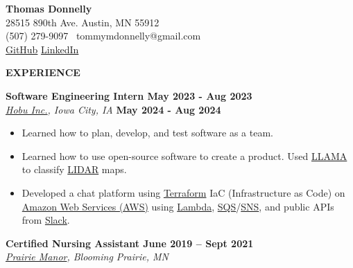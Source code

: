 \textbf{Thomas Donnelly}\\
28515 890th Ave. \textbar{} Austin, MN 55912\\
(507) 279-9097 \textbar~tommymdonnelly@gmail.com\\
\href{https://github.com/TomTheTonk}{GitHub}
\href{http://linkedin.com/in/thomas-donnelly-429405320}{LinkedIn}

\textbf{EXPERIENCE}

\textbf{Software Engineering Intern May 2023 - Aug 2023}\\
\emph{\href{https://www.linkedin.com/company/hobu-inc}{Hobu Inc.}, Iowa
City, IA} \textbf{May 2024 - Aug 2024}

\begin{itemize}
\item
  Learned how to plan, develop, and test software as a team.
\item
  Learned how to use open-source software to create a product. Used
  \href{https://www.llama.com/}{LLAMA} to classify
  \href{https://www.neonscience.org/resources/learning-hub/tutorials/lidar-basics}{LIDAR}
  maps.
\item
  Developed a chat platform using
  \href{https://developer.hashicorp.com/terraform/language}{Terraform}
  IaC (Infrastructure as Code) on
  \href{https://aws.amazon.com/free/?gclid=CjwKCAiAiOa9BhBqEiwABCdG8xJm7dpo0Ifa4i8UYcSexU289wg1I5QgB0YQaTpD3Cc5l3oCR2H94hoCvTYQAvD_BwE\&trk=6a4c3e9d-cdc9-4e25-8dd9-2bd8d15afbca\&sc_channel=ps\&ef_id=CjwKCAiAiOa9BhBqEiwABCdG8xJm7dpo0Ifa4i8UYcSexU289wg1I5QgB0YQaTpD3Cc5l3oCR2H94hoCvTYQAvD_BwE:G:s\&s_kwcid=AL!4422!3!651751059777!e!!g!!amazon\%20web\%20services!19852662197!145019195737\&all-free-tier.sort-by=item.additionalFields.SortRank\&all-free-tier.sort-order=asc\&awsf.Free\%20Tier\%20Types=*all\&awsf.Free\%20Tier\%20Categories=*all}{Amazon
  Web Services (AWS)} using
  \href{https://aws.amazon.com/pm/lambda/?gclid=CjwKCAiAiOa9BhBqEiwABCdG8_-jcsK9i3KVP2t5NgupDXinpyF36M-7OgfzGPhJI0F8zaahD0sMmBoC8NIQAvD_BwE\&trk=e0e0d4be-47fe-4336-ab69-7eece7f3d36e\&sc_channel=ps\&ef_id=CjwKCAiAiOa9BhBqEiwABCdG8_-jcsK9i3KVP2t5NgupDXinpyF36M-7OgfzGPhJI0F8zaahD0sMmBoC8NIQAvD_BwE:G:s\&s_kwcid=AL!4422!3!652240143523!e!!g!!amazon\%20lambda!19878797032!147151597893}{Lambda},
  \href{https://aws.amazon.com/sqs/}{SQS}/\href{https://aws.amazon.com/sns/}{SNS},
  and public APIs from \href{https://slack.com/}{Slack}.
\end{itemize}

\textbf{Certified Nursing Assistant June 2019 -- Sept 2021}\\
\emph{\href{https://prairiemanorcare.com/}{Prairie Manor}, Blooming
Prairie, MN}


